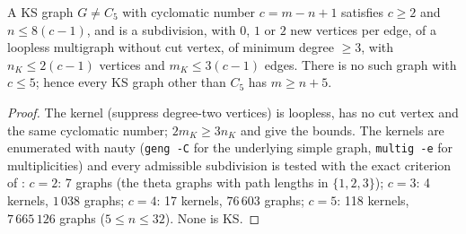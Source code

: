 \documentclass[11pt,a4paper]{report}
\begin{document}
\begin{theorem}\label{thm:cyclomatic}
A KS graph $G\ne C_5$ with cyclomatic number $c=m-n+1$ satisfies $c\ge2$ and $n\le 8(c-1)$, and is a
subdivision, with $0$, $1$ or $2$ new vertices per edge, of a loopless multigraph without cut vertex, of
minimum degree $\ge3$, with $n_K\le 2(c-1)$ vertices and $m_K\le3(c-1)$ edges. There is no such graph with
$c\le5$; hence every KS graph other than $C_5$ has $m\ge n+5$.
\end{theorem}
\begin{proof}
The kernel (suppress degree-two vertices) is loopless, has no cut vertex and the same cyclomatic number;
$2m_K\ge3n_K$ and  give the bounds. The kernels are enumerated with nauty
\autocite{MP14} (\texttt{geng -C} for the underlying simple graph, \texttt{multig -e} for multiplicities) and
every admissible subdivision is tested with the exact criterion of : $c=2$: 7 graphs (the
theta graphs with path lengths in $\{1,2,3\}$); $c=3$: 4 kernels, $1\,038$ graphs; $c=4$: 17 kernels,
$76\,603$ graphs; $c=5$: 118 kernels, $7\,665\,126$ graphs ($5\le n\le32$). None is KS.
\end{proof}
\end{document}
